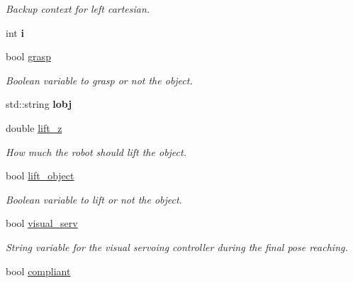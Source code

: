 \begin{DoxyCompactItemize}
\begin{DoxyCompactList}\small\item\em Backup context for left cartesian. \end{DoxyCompactList}\item 
int {\bfseries i}\label{classGraspExecution_a344f407ea6a058eacfb4e2d90eb51735}

\item 
bool \hyperlink{classGraspExecution_a611a58c5c2d2d7c32650bea057b35b5b}{grasp}\label{classGraspExecution_a611a58c5c2d2d7c32650bea057b35b5b}

\begin{DoxyCompactList}\small\item\em Boolean variable to grasp or not the object. \end{DoxyCompactList}\item 
std\+::string {\bfseries lobj}\label{classGraspExecution_a79b348f9568652db2921d279abcc1bcb}

\item 
double \hyperlink{classGraspExecution_a7c860cfc650285d57e86fd51ecbf30c1}{lift\+\_\+z}\label{classGraspExecution_a7c860cfc650285d57e86fd51ecbf30c1}

\begin{DoxyCompactList}\small\item\em How much the robot should lift the object. \end{DoxyCompactList}\item 
bool \hyperlink{classGraspExecution_a4d42020c419b390a9a336d91c0a1c3ae}{lift\+\_\+object}\label{classGraspExecution_a4d42020c419b390a9a336d91c0a1c3ae}

\begin{DoxyCompactList}\small\item\em Boolean variable to lift or not the object. \end{DoxyCompactList}\item 
bool \hyperlink{classGraspExecution_a3e8755ff9c95ee15784a7d46f74489fd}{visual\+\_\+serv}\label{classGraspExecution_a3e8755ff9c95ee15784a7d46f74489fd}

\begin{DoxyCompactList}\small\item\em String variable for the visual servoing controller during the final pose reaching. \end{DoxyCompactList}\item 
bool \hyperlink{classGraspExecution_ad3dc733ddabb20c1d53a195fcad3af3a}{compliant}\label{classGraspExecution_ad3dc733ddabb20c1d53a195fcad3af3a}


\end{DoxyCompactItemize}
